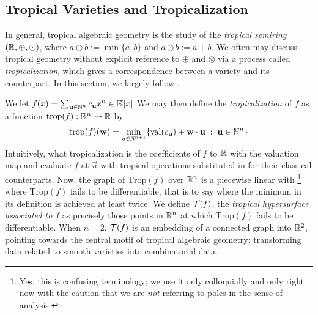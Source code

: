 \documentclass[12pt,letter]{article}
\newcommand{\trop}{\mathrm{Trop}}
\begin{document}
\begin{example}
\begin{figure}
\end{figure}
\end{example}
\subsection{Tropical Varieties and Tropicalization}
\label{deftrop}
In general, tropical algebraic geometry is the study of the \emph{tropical semiring} $({\mathbb R},\oplus,\odot)$, where $a\oplus b:=\min\{a,b\}$ and $a\odot b:=a+b$. We often may discuss tropical geometry without explicit reference to $\oplus$ and $\otimes$ via a process called \emph{tropicalization}, which gives a correspondence between a variety and its  counterpart. In this section, we largely follow \cite[\S3]{MaSt15}. 

 We let $f(x)=\sum_{\mathbf{u}\in {\mathbb N}^{n}}c_{\mathbf{u}}x^{\mathbf{u}}\in {\mathbb K}[x]$ We may then define the \emph{tropicalization} of $f$ as a function $\mathrm{trop}(f):{\mathbb R}^{n}\to {\mathbb R}$ by \begin{equation} \mathrm{trop}(f)(\mathbf{w})=\min_{u\in {\mathbb N}^{n+1}} \{\mathrm{val}(c_{\mathbf{u}})+\mathbf{w}\cdot\mathbf{u}\;:\;\mathbf{u}\in {\mathbb N}^{n}\}
\end{equation}
Intuitively, what tropicalization  is  the coefficients of $f$ to ${\mathbb R}$ with the valuation map and evaluate $f$ at $\vec{u}$ with tropical operations substituted in for their classical counterparts. Now, the graph of $\trop(f)$ over ${\mathbb R}^{n}$ is a piecewise linear  with \footnote{Yes, this is confusing terminology; we use it only colloquially and only right now with the caution that we are \emph{not} referring to poles in the sense of analysis.} where $\trop(f)$ fails to be differentiable, that is to say where the minimum in its definition is achieved at least twice. We define ${\mathcal T}(f)$, the \emph{tropical hypersurface associated to $f$} as precisely those points in ${\mathbb R}^{n}$ at which $\trop(f)$ fails to be differentiable. When $n=2$, ${\mathcal T}(f)$ is an embedding of a connected graph into ${\mathbb R}^2$, pointing towards the central motif of tropical algebraic geometry: transforming data related to smooth varieties into combinatorial data.
\end{document}
